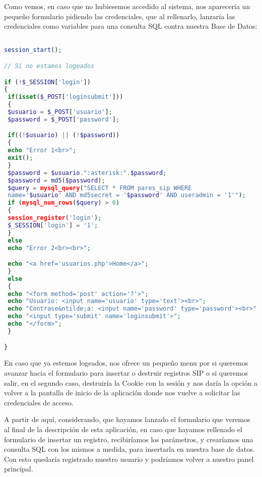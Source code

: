 Como vemos, en caso que no hubiesemos accedido al sistema, nos aparecería un pequeño formulario pidiendo las credenciales, que al rellenarlo, lanzaría las credenciales como variables para una consulta SQL contra nuestra Base de Datos:

\begin{lstlisting}[language=php,title={./www/usuarios.php}]

session_start();

// Si no estamos logeados

if (!$_SESSION['login'])
{
 if(isset($_POST['loginsubmit']))
 {
 $usuario = $_POST['usuario'];
 $password = $_POST['password'];

 if((!$usuario) || (!$password))
 {
 echo "Error 1<br>";
 exit();
 }
 $password = $usuario.":asterisk:".$password;
 $password = md5($password);
 $query = mysql_query("SELECT * FROM pares_sip WHERE 
 name='$usuario' AND md5secret = '$password' AND useradmin = '1'");
 if (mysql_num_rows($query) > 0)
 {
 session_register('login');
 $_SESSION['login'] = '1';
 }
 else
 echo "Error 2<br><br>";

 echo "<a href='usuarios.php'>Home</a>";
 }
 else
 {
 echo "<form method='post' action='?'>";
 echo "Usuario: <input name='usuario' type='text'><br>";
 echo "Contrase&ntilde;a: <input name='password' type='password'><br>";
 echo "<input type='submit' name='loginsubmit'>";
 echo "</form>";
 }

}

\end{lstlisting}

En caso que ya estemos logeados, nos ofrece un pequeño menu por si queremos avanzar hacia el formulario para insertar o destruir registros SIP o si queremos salir, en el segundo caso, destruiría la Cookie con la sesión y nos daría la opción a volver a la pantalla de inicio de la aplicación donde nos vuelve a solicitar las credenciales de acceso.

A partir de aquí, considerando, que hayamos lanzado el formulario que veremos al final de la descripción de esta aplicación, en caso que hayamos rellenado el formulario de insertar un registro, recibiríamos los parámetros, y crearíamos una consulta SQL con los mismos a medida, para insertarla en nuestra base de datos. Con esto quedaría registrado nuestro usuario y podríamos volver a nuestro panel principal.

